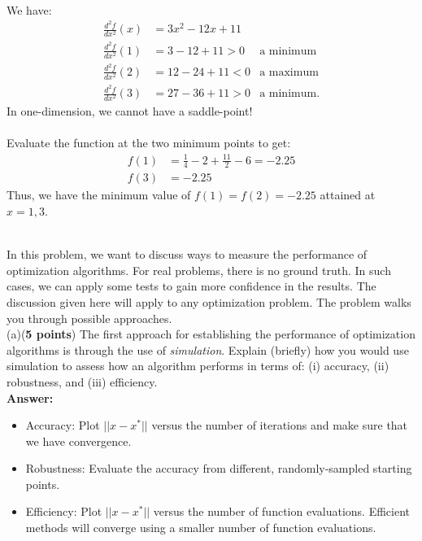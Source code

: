 \documentclass[12pt,legalpaper]{article}
\begin{document}
\\
We have:
\begin{align*}
  \frac{d^2 f}{d x^2} (x) &= 3 x^2 - 12 x + 11 \\
  \frac{d^2 f}{d x^2} (1) &= 3 - 12 + 11 > 0    & \text{a minimum} \\
  \frac{d^2 f}{d x^2} (2) &= 12 - 24 + 11 < 0  & \text{a maximum} \\
  \frac{d^2 f}{d x^2} (3) &= 27 - 36 + 11 > 0  & \text{a minimum}.
\end{align*}
In one-dimension, we cannot have a saddle-point! \\

\\
Evaluate the function at the two minimum points to get:
\begin{align*}
 f(1) &= \frac{1}{4} - 2 + \frac{11}{2} - 6 = -2.25 \\
 f(3) &= - 2.25
\end{align*}
Thus, we have the minimum value of $f(1)=f(2)=-2.25$ attained at $x=1,3$.
\newpage

\\
In this problem, we want to discuss ways to measure the performance of optimization algorithms.
For real problems, there is no ground truth. In such cases, we can apply some tests to gain more confidence in
the results. The discussion given here will apply to any optimization problem. The problem walks you through
possible approaches.\\
  
(a)({\bf 5 points}) The first approach for establishing the performance of
    optimization algorithms is through the use of {\it simulation}.
    Explain (briefly) how you would use simulation to assess how an algorithm performs
    in terms of: (i) accuracy, (ii) robustness, and (iii) efficiency.\\
    
    {\bf Answer:} 
    \begin{itemize}
    \item Accuracy: Plot $||x-x^*||$ versus the number of iterations and make sure that we have convergence.
    \item Robustness: Evaluate the accuracy from different, randomly-sampled starting points.
    \item Efficiency: Plot $||x-x^*||$ versus the number of function evaluations. Efficient methods will converge
                               using a smaller number of function evaluations.
   \end{itemize}
\end{document}
